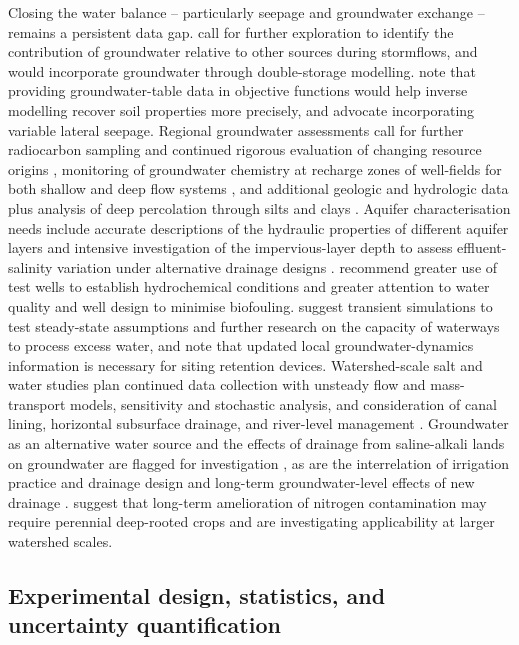 Closing the water balance -- particularly seepage and groundwater exchange --
remains a persistent data gap. \textcite{Grose2022} call for further exploration
to identify the contribution of groundwater relative to other sources during
stormflows, and \textcite{DaneshYazdi2016} would incorporate groundwater through
double-storage modelling. \textcite{Sedaghatdoost2018} note that providing
groundwater-table data in objective functions would help inverse modelling recover
soil properties more precisely, and \textcite{Feng2018} advocate incorporating
variable lateral seepage. Regional groundwater assessments call for further
radiocarbon sampling and continued rigorous evaluation of changing resource origins
\parencite{Tweed2018}, monitoring of groundwater chemistry at recharge zones of
well-fields for both shallow and deep flow systems \parencite{Dragon2016}, and
additional geologic and hydrologic data plus analysis of deep percolation through
silts and clays \parencite{BOOKMAN1959}. Aquifer characterisation needs include
accurate descriptions of the hydraulic properties of different aquifer layers
\parencite{KAMRA1991} and intensive investigation of the impervious-layer depth to
assess effluent-salinity variation under alternative drainage designs
\parencite{KAMRA1994}. \textcite{Stuetz2004} recommend greater use of test wells to
establish hydrochemical conditions and greater attention to water quality and well
design to minimise biofouling. \textcite{Schilling2022} suggest transient
simulations to test steady-state assumptions and further research on the capacity
of waterways to process excess water, and \textcite{Xu2022} note that updated local
groundwater-dynamics information is necessary for siting retention devices.
Watershed-scale salt and water studies plan continued data collection with
unsteady flow and mass-transport models, sensitivity and stochastic analysis, and
consideration of canal lining, horizontal subsurface drainage, and river-level
management \parencite{Gates2002,Burkhalter2006}. Groundwater as an alternative
water source and the effects of drainage from saline-alkali lands on groundwater
are flagged for investigation \parencite{Zheng2025b}, as are the interrelation of
irrigation practice and drainage design \parencite{Sinai2005} and long-term
groundwater-level effects of new drainage \parencite{Okuda2020}. \textcite{Keller2008}
suggest that long-term amelioration of nitrogen contamination may require perennial
deep-rooted crops and are investigating applicability at larger watershed scales.

\subsection{Experimental design, statistics, and uncertainty quantification}

